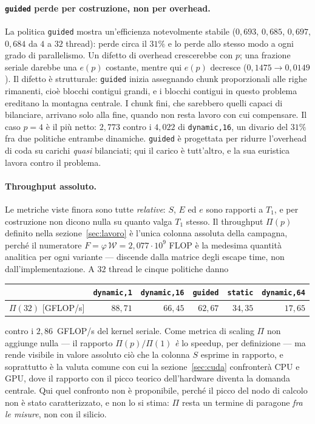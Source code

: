 \paragraph{\texttt{guided} perde per costruzione, non per overhead.}
La politica \texttt{guided} mostra un'efficienza notevolmente stabile
($0{,}693$, $0{,}685$, $0{,}697$, $0{,}684$ da $4$ a $32$ thread): perde circa
il $31\%$ e lo perde allo stesso modo a ogni grado di parallelismo. Un difetto
di overhead crescerebbe con $p$; una frazione seriale darebbe una $e(p)$
costante, mentre qui $e(p)$ decresce ($0{,}1475 \to 0{,}0149$). Il difetto è
strutturale: \texttt{guided} inizia assegnando chunk proporzionali
alle righe rimanenti, cioè blocchi contigui grandi, e i blocchi contigui in
questo problema ereditano la montagna centrale. I chunk fini, che sarebbero
quelli capaci di bilanciare, arrivano solo alla fine, quando non resta lavoro
con cui compensare. Il caso $p=4$ è il più netto: $2{,}773$ contro i $4{,}022$
di \texttt{dynamic,16}, un divario del $31\%$ fra due politiche entrambe
dinamiche. \texttt{guided} è progettata per ridurre l'overhead di coda su
carichi \emph{quasi} bilanciati; qui il carico è tutt'altro, e la sua euristica
lavora contro il problema.

\paragraph{Throughput assoluto.}
Le metriche viste finora sono tutte \emph{relative}: $S$, $E$ ed $e$ sono
rapporti a $T_1$, e per costruzione non dicono nulla su quanto valga $T_1$
stesso. Il throughput $\Pi(p)$ definito nella sezione~\ref{sec:lavoro}
è l'unica colonna assoluta della campagna, perché il numeratore
$F = \varphi\,\mathcal{W} = 2{,}077\cdot10^{9}$ FLOP è la medesima quantità
analitica per ogni variante --- discende dalla matrice degli escape time, non
dall'implementazione. A $32$ thread le cinque politiche danno

\begin{center}
\begin{tabular}{lrrrrr}
    \hline
    & \texttt{dynamic,1} & \texttt{dynamic,16} & \texttt{guided} & \texttt{static} & \texttt{dynamic,64} \\
    \hline
    $\Pi(32)$ [GFLOP/s] & $88{,}71$ & $66{,}45$ & $62{,}67$ & $34{,}35$ & $17{,}65$ \\
    \hline
\end{tabular}
\end{center}

\noindent contro i $2{,}86$~GFLOP/s del kernel seriale. Come metrica di scaling
$\Pi$ non aggiunge nulla --- il rapporto $\Pi(p)/\Pi(1)$ \emph{è} lo speedup,
per definizione --- ma rende visibile in valore assoluto ciò che la colonna $S$
esprime in rapporto, e soprattutto è la valuta comune con cui la
sezione~\ref{sec:cuda} confronterà CPU e GPU, dove il rapporto con il picco
teorico dell'hardware diventa la domanda centrale. Qui quel confronto non è
proponibile, perché il picco del nodo di calcolo non è stato caratterizzato, e
non lo si stima: $\Pi$ resta un termine di paragone \emph{fra le misure}, non
con il silicio.

